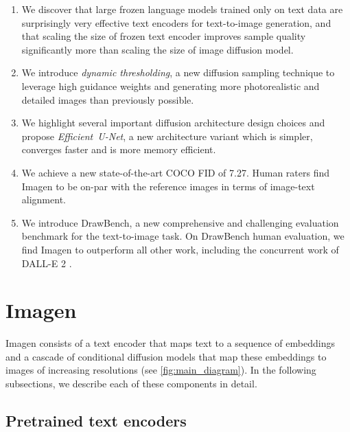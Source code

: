 \begin{enumerate}[noitemsep,nolistsep,leftmargin=0.5cm]
    \item We discover that large frozen language models trained only on text data are surprisingly very effective text encoders for text-to-image generation, and that scaling the size of frozen text encoder improves sample quality significantly more than scaling the size of image diffusion model.
    \item We introduce \emph{dynamic thresholding}, a new diffusion sampling technique to leverage high guidance weights and generating more photorealistic and detailed images than previously possible.
    \item We highlight several important diffusion architecture design choices and propose \mbox{\emph{Efficient U-Net}}, a new architecture variant which is simpler, converges faster and is more memory efficient. 
    \item We achieve a new state-of-the-art COCO FID of 7.27. Human raters find Imagen to be on-par with the reference images in terms of image-text alignment. 
    \item We introduce DrawBench, a new comprehensive and challenging evaluation benchmark for the text-to-image task. On DrawBench human evaluation, we find Imagen to outperform all other work, including the concurrent work of DALL-E 2 \cite{ramesh-dalle2}.
\end{enumerate}

\section{Imagen}

Imagen consists of a text encoder that maps text to a sequence of embeddings and a cascade of conditional diffusion models that map these embeddings to images of increasing resolutions (see \ref{fig:main_diagram}). In the following subsections, we describe each of these components in detail.

\subsection{Pretrained text encoders}

